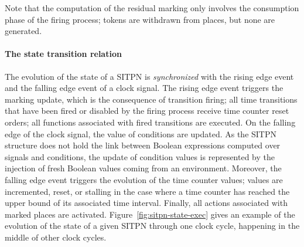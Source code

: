 Note that the computation of the residual marking only involves the
consumption phase of the firing process; tokens are withdrawn from
places, but none are generated.



\paragraph{The state transition relation}

The evolution of the state of a SITPN is \textit{synchronized} with
the rising edge event and the falling edge event of a clock signal.
The rising edge event triggers the marking update, which is the
consequence of transition firing; all time transitions that have been
fired or disabled by the firing process receive time counter reset
orders; all functions associated with fired transitions are
executed. On the falling edge of the clock signal, the value of
conditions are updated. As the SITPN structure does not hold the link
between Boolean expressions computed over \vhdl{} signals and
conditions, the update of condition values is represented by the
injection of fresh Boolean values coming from an
environment. Moreover, the falling edge event triggers the evolution
of the time counter values; values are incremented, reset, or stalling
in the case where a time counter has reached the upper bound of its
associated time interval. Finally, all actions associated with marked
places are activated. Figure~\ref{fig:sitpn-state-exec} gives an
example of the evolution of the state of a given SITPN through one
clock cycle, happening in the middle of other clock cycles. %

